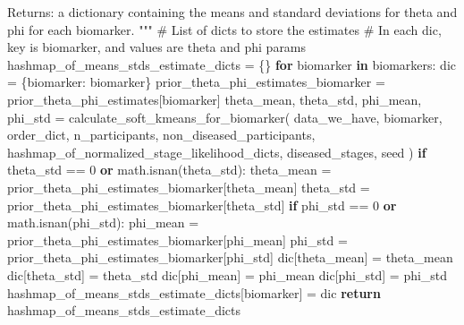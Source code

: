 \documentclass[
  letterpaper,
  DIV=11,
  numbers=noendperiod]{scrreprt}
\newenvironment{Shaded}{\begin{snugshade}}{\end{snugshade}}
\newcommand{\CommentTok}[1]{\textcolor[rgb]{0.37,0.37,0.37}{#1}}
\newcommand{\ControlFlowTok}[1]{\textcolor[rgb]{0.00,0.23,0.31}{\textbf{#1}}}
\newcommand{\DecValTok}[1]{\textcolor[rgb]{0.68,0.00,0.00}{#1}}
\newcommand{\KeywordTok}[1]{\textcolor[rgb]{0.00,0.23,0.31}{\textbf{#1}}}
\newcommand{\NormalTok}[1]{\textcolor[rgb]{0.00,0.23,0.31}{#1}}
\newcommand{\OperatorTok}[1]{\textcolor[rgb]{0.37,0.37,0.37}{#1}}
\newcommand{\StringTok}[1]{\textcolor[rgb]{0.13,0.47,0.30}{#1}}
\begin{document}
\begin{Shaded}
\begin{Highlighting}[]
\CommentTok{    Returns:}
\CommentTok{        a dictionary containing the means and standard deviations for theta and phi for each biomarker.}
\CommentTok{    """}
    \CommentTok{\# List of dicts to store the estimates}
    \CommentTok{\# In each dic, key is biomarker, and values are theta and phi params}
\NormalTok{    hashmap\_of\_means\_stds\_estimate\_dicts }\OperatorTok{=}\NormalTok{ \{\}}
    \ControlFlowTok{for}\NormalTok{ biomarker }\KeywordTok{in}\NormalTok{ biomarkers:}
\NormalTok{        dic }\OperatorTok{=}\NormalTok{ \{}\StringTok{\textquotesingle{}biomarker\textquotesingle{}}\NormalTok{: biomarker\}}
\NormalTok{        prior\_theta\_phi\_estimates\_biomarker }\OperatorTok{=}\NormalTok{ prior\_theta\_phi\_estimates[biomarker]}
\NormalTok{        theta\_mean, theta\_std, phi\_mean, phi\_std }\OperatorTok{=}\NormalTok{ calculate\_soft\_kmeans\_for\_biomarker(}
\NormalTok{            data\_we\_have,}
\NormalTok{            biomarker,}
\NormalTok{            order\_dict,}
\NormalTok{            n\_participants,}
\NormalTok{            non\_diseased\_participants,}
\NormalTok{            hashmap\_of\_normalized\_stage\_likelihood\_dicts,}
\NormalTok{            diseased\_stages,}
\NormalTok{            seed}
\NormalTok{        )}
        \ControlFlowTok{if}\NormalTok{ theta\_std }\OperatorTok{==} \DecValTok{0} \KeywordTok{or}\NormalTok{ math.isnan(theta\_std):}
\NormalTok{            theta\_mean }\OperatorTok{=}\NormalTok{ prior\_theta\_phi\_estimates\_biomarker[}\StringTok{\textquotesingle{}theta\_mean\textquotesingle{}}\NormalTok{]}
\NormalTok{            theta\_std }\OperatorTok{=}\NormalTok{ prior\_theta\_phi\_estimates\_biomarker[}\StringTok{\textquotesingle{}theta\_std\textquotesingle{}}\NormalTok{]}
        \ControlFlowTok{if}\NormalTok{ phi\_std }\OperatorTok{==} \DecValTok{0} \KeywordTok{or}\NormalTok{ math.isnan(phi\_std):}
\NormalTok{            phi\_mean }\OperatorTok{=}\NormalTok{ prior\_theta\_phi\_estimates\_biomarker[}\StringTok{\textquotesingle{}phi\_mean\textquotesingle{}}\NormalTok{]}
\NormalTok{            phi\_std }\OperatorTok{=}\NormalTok{ prior\_theta\_phi\_estimates\_biomarker[}\StringTok{\textquotesingle{}phi\_std\textquotesingle{}}\NormalTok{]}
\NormalTok{        dic[}\StringTok{\textquotesingle{}theta\_mean\textquotesingle{}}\NormalTok{] }\OperatorTok{=}\NormalTok{ theta\_mean}
\NormalTok{        dic[}\StringTok{\textquotesingle{}theta\_std\textquotesingle{}}\NormalTok{] }\OperatorTok{=}\NormalTok{ theta\_std}
\NormalTok{        dic[}\StringTok{\textquotesingle{}phi\_mean\textquotesingle{}}\NormalTok{] }\OperatorTok{=}\NormalTok{ phi\_mean}
\NormalTok{        dic[}\StringTok{\textquotesingle{}phi\_std\textquotesingle{}}\NormalTok{] }\OperatorTok{=}\NormalTok{ phi\_std}
\NormalTok{        hashmap\_of\_means\_stds\_estimate\_dicts[biomarker] }\OperatorTok{=}\NormalTok{ dic}
    \ControlFlowTok{return}\NormalTok{ hashmap\_of\_means\_stds\_estimate\_dicts}


\end{Highlighting}
\end{Shaded}
\end{document}
